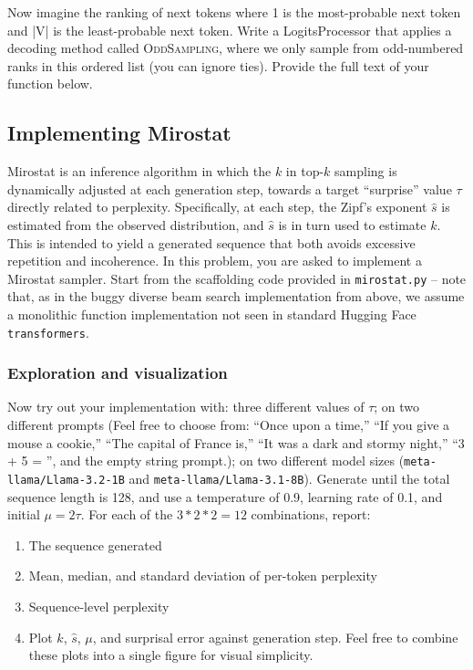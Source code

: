 \documentclass{article}
\begin{document}
Now imagine the ranking of next tokens where 1 is the most-probable next token and |V| is the least-probable next token. Write a LogitsProcessor that applies a decoding method called \textsc{OddSampling}, where we only sample from odd-numbered ranks in this ordered list (you can ignore ties). Provide the full text of your function below. 

\begin{solve}

\end{solve}


\subsection{Implementing Mirostat}

Mirostat \cite{basu2021mirostatneuraltextdecoding} is an inference algorithm in which the $k$ in top-$k$ sampling is dynamically adjusted at each generation step, towards a target ``surprise'' value $\tau$ directly related to perplexity. Specifically, at each step, the Zipf's exponent $\hat{s}$ is estimated from the observed distribution, and $\hat{s}$ is in turn used to estimate $k$. This is intended to yield a generated sequence that both avoids excessive repetition and incoherence. In this problem, you are asked to implement a Mirostat sampler. Start from the scaffolding code provided in \texttt{mirostat.py} -- note that, as in the buggy diverse beam search implementation from above, we assume a monolithic function implementation not seen in standard Hugging Face \texttt{transformers}.

\subsubsection{Exploration and visualization}
Now try out your implementation with: three different values of $\tau$; on two different prompts (Feel free to choose from: ``Once upon a time,'' ``If you give a mouse a cookie,'' ``The capital of France is,'' ``It was a dark and stormy night,'' ``3 + 5 = '', and the empty string prompt.); on two different model sizes (\texttt{meta-llama/Llama-3.2-1B} and \texttt{meta-llama/Llama-3.1-8B}). Generate until the total sequence length is 128, and use a temperature of 0.9, learning rate of 0.1, and initial $\mu=2\tau$. For each of the $3 * 2 * 2 = 12$ combinations, report:
\begin{enumerate}
    \item The sequence generated
    \item Mean, median, and standard deviation of per-token perplexity
    \item Sequence-level perplexity
    \item Plot $k$, $\hat{s}$, $\mu$, and surprisal error against generation step. Feel free to combine these plots into a single figure for visual simplicity.
\end{enumerate}
\end{document}
